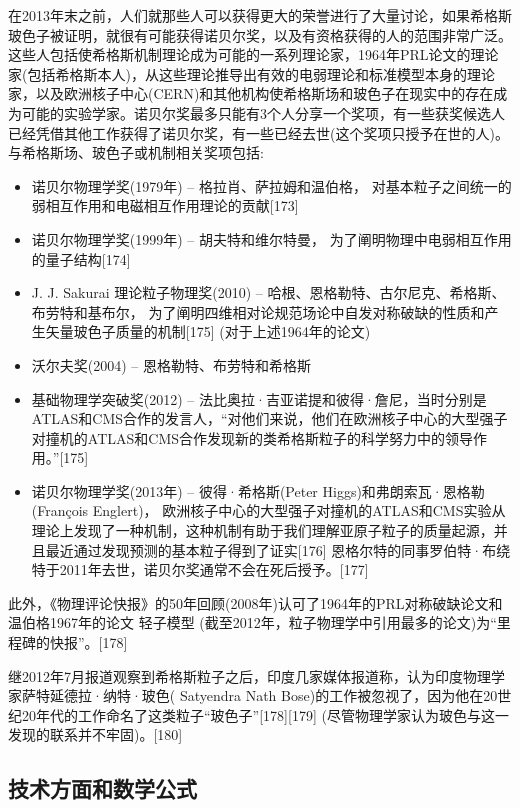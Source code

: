 在2013年末之前，人们就那些人可以获得更大的荣誉进行了大量讨论，如果希格斯玻色子被证明，就很有可能获得诺贝尔奖，以及有资格获得的人的范围非常广泛。这些人包括使希格斯机制理论成为可能的一系列理论家，1964年PRL论文的理论家(包括希格斯本人)，从这些理论推导出有效的电弱理论和标准模型本身的理论家，以及欧洲核子中心(CERN)和其他机构使希格斯场和玻色子在现实中的存在成为可能的实验学家。诺贝尔奖最多只能有3个人分享一个奖项，有一些获奖候选人已经凭借其他工作获得了诺贝尔奖，有一些已经去世(这个奖项只授予在世的人)。与希格斯场、玻色子或机制相关奖项包括:

\begin{itemize}
\item 诺贝尔物理学奖(1979年) – 格拉肖、萨拉姆和温伯格， 对基本粒子之间统一的弱相互作用和电磁相互作用理论的贡献[173]
\item 诺贝尔物理学奖(1999年) – 胡夫特和维尔特曼， 为了阐明物理中电弱相互作用的量子结构[174]
\item J. J. Sakurai 理论粒子物理奖(2010) – 哈根、恩格勒特、古尔尼克、希格斯、布劳特和基布尔， 为了阐明四维相对论规范场论中自发对称破缺的性质和产生矢量玻色子质量的机制[175] (对于上述1964年的论文)
\item 沃尔夫奖(2004) – 恩格勒特、布劳特和希格斯
\item 基础物理学突破奖(2012) – 法比奥拉·吉亚诺提和彼得·詹尼，当时分别是ATLAS和CMS合作的发言人，“对他们来说，他们在欧洲核子中心的大型强子对撞机的ATLAS和CMS合作发现新的类希格斯粒子的科学努力中的领导作用。”[175]
\item 诺贝尔物理学奖(2013年) – 彼得·希格斯(Peter Higgs)和弗朗索瓦·恩格勒(François Englert)， 欧洲核子中心的大型强子对撞机的ATLAS和CMS实验从理论上发现了一种机制，这种机制有助于我们理解亚原子粒子的质量起源，并且最近通过发现预测的基本粒子得到了证实[176] 恩格尔特的同事罗伯特·布绕特于2011年去世，诺贝尔奖通常不会在死后授予。[177]
\end{itemize}

此外，《物理评论快报》的50年回顾(2008年)认可了1964年的PRL对称破缺论文和温伯格1967年的论文 轻子模型 (截至2012年，粒子物理学中引用最多的论文)为“里程碑的快报”。[178]

继2012年7月报道观察到希格斯粒子之后，印度几家媒体报道称，认为印度物理学家萨特延德拉·纳特·玻色( Satyendra Nath Bose)的工作被忽视了，因为他在20世纪20年代的工作命名了这类粒子“玻色子”[178][179] (尽管物理学家认为玻色与这一发现的联系并不牢固)。[180]

\subsection{技术方面和数学公式}

